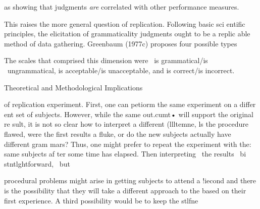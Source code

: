 \begin{styleTextbody}
as showing that judgments \textit{are}\textit{ }correlated with other performance measures.
\end{styleTextbody}


\begin{styleTextbody}
This raises the more general question of replication. Following basic sci\- entific principles, the elicitation of grammaticality judgments ought to be a replic\- able method of data gathering. Greenbaum (1977c) proposes four possible types
\end{styleTextbody}


\setcounter{listWWNumxviiileveli}{10}
\begin{listWWNumxviiileveli}
\item 
\begin{styleStandard}
The scales that comprised this dimension were \ {\textquotedbl}is grammatical/is \ ungrammatical,{\textquotedbl} {\textquotedbl}is acceptable/is unacceptable,{\textquotedbl} and {\textquotedbl}is correct/is incorrect.{\textquotedbl}
\end{styleStandard}


\end{listWWNumxviiileveli}
\clearpage\setcounter{page}{1}\begin{styleStandard}
Theoretical and Methodological Implications
\end{styleStandard}


\begin{styleStandard}
of replication experiment. First, one can peti{\textquotesingle}orm the same experiment on a differ\- ent set of subjects. However, while the same out.cumt• will support the original re\- sult, it is not so clear how to interpret a different (llltemne, ls the procedure flawed, were the first results a fluke, or do the new subjects actually have different gram\- mars? Thus, one might prefer to repeat the experiment with the: same subjects af\- ter some time has elapsed. Then interpreting \ the results \ bi stntlghtforward, \ but
\end{styleStandard}


\begin{styleStandard}
procedural problems might arise in getting subjects to attend a !iecond {\textquotedbl}{\textquotedbl}{\textquotesingle}{\textquotedbl}{\textquotedbl}{\textquotesingle}{\textquotesingle}{\textquotesingle}{\textquotesingle}{\textquotedbl} and there is the possibility that they will take a different approach to the based on their first experience. A third possibility would be to keep the stlfne
\end{styleStandard}


